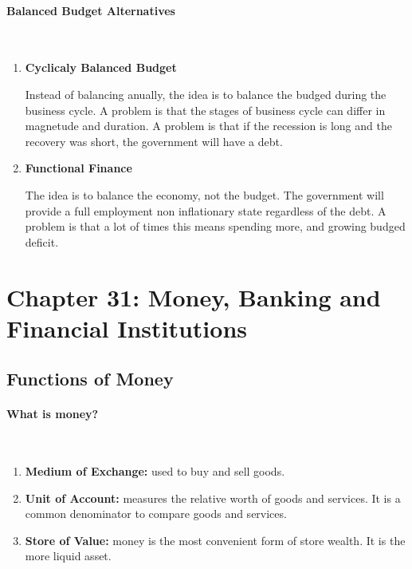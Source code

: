 \paragraph{Balanced Budget Alternatives}\ 

\begin{enumerate}[label = \textbullet]
	\item \textbf{Cyclicaly Balanced Budget}\ 

		Instead of balancing anually, the idea is to balance the budged during the business cycle.  A problem is that the stages of business cycle can differ in magnetude and duration. A problem is that if the recession is long and the recovery was short, the government will have a debt.

	\item \textbf{Functional Finance}\ 

		The idea is to balance the economy, not the budget. The government will provide a full employment non inflationary state regardless of the debt.  A problem is that a lot of times this means spending more, and growing budged deficit.
	
\end{enumerate}

\section{Chapter 31: Money, Banking and Financial Institutions}

\subsection{Functions of Money}

\paragraph{What is money?}\ 

\begin{enumerate}[label = \textbullet]
	\item \textbf{Medium of Exchange:} used to buy and sell goods.

	\item \textbf{Unit of Account:} measures the relative worth of goods and services. It is a common denominator to compare goods and services.

	\item \textbf{Store of Value:} money is the most convenient form of store wealth. It is the more liquid asset.
\end{enumerate}

